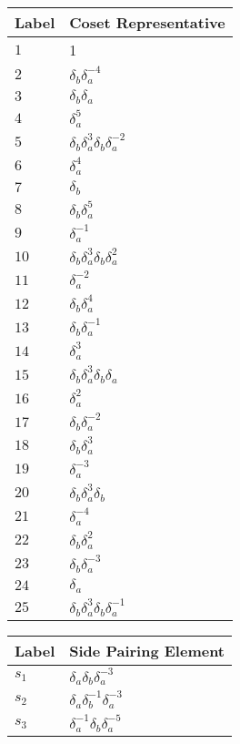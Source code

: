 \documentclass{article}
\begin{document}

\begin{center}
\begin{tabular}{ll}
\toprule
Label & Coset Representative\\
\midrule
$1$ & 1 \\
$2$ & $\delta_b^{}\delta_a^{-4}$ \\
$3$ & $\delta_b^{}\delta_a^{}$ \\
$4$ & $\delta_a^{5}$ \\
$5$ & $\delta_b^{}\delta_a^{3}\delta_b^{}\delta_a^{-2}$ \\
$6$ & $\delta_a^{4}$ \\
$7$ & $\delta_b^{}$ \\
$8$ & $\delta_b^{}\delta_a^{5}$ \\
$9$ & $\delta_a^{-1}$ \\
$10$ & $\delta_b^{}\delta_a^{3}\delta_b^{}\delta_a^{2}$ \\
$11$ & $\delta_a^{-2}$ \\
$12$ & $\delta_b^{}\delta_a^{4}$ \\
$13$ & $\delta_b^{}\delta_a^{-1}$ \\
$14$ & $\delta_a^{3}$ \\
$15$ & $\delta_b^{}\delta_a^{3}\delta_b^{}\delta_a^{}$ \\
$16$ & $\delta_a^{2}$ \\
$17$ & $\delta_b^{}\delta_a^{-2}$ \\
$18$ & $\delta_b^{}\delta_a^{3}$ \\
$19$ & $\delta_a^{-3}$ \\
$20$ & $\delta_b^{}\delta_a^{3}\delta_b^{}$ \\
$21$ & $\delta_a^{-4}$ \\
$22$ & $\delta_b^{}\delta_a^{2}$ \\
$23$ & $\delta_b^{}\delta_a^{-3}$ \\
$24$ & $\delta_a^{}$ \\
$25$ & $\delta_b^{}\delta_a^{3}\delta_b^{}\delta_a^{-1}$ \\
\bottomrule
\end{tabular}
\hfill
\begin{tabular}{ll}
\toprule
Label & Side Pairing Element\\
\midrule
$s_{1}$ & $\delta_a^{}\delta_b^{}\delta_a^{-3}$ \\
$s_{2}$ & $\delta_a^{}\delta_b^{-1}\delta_a^{-3}$ \\
$s_{3}$ & $\delta_a^{-1}\delta_b^{}\delta_a^{-5}$ \\

\end{tabular}
\end{center}
\end{document}
